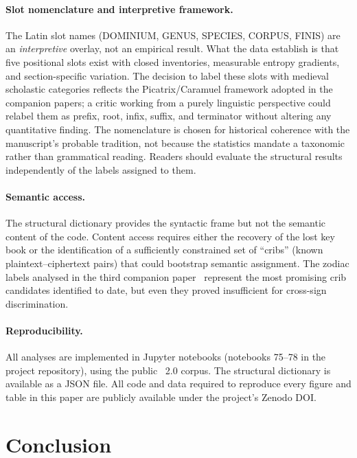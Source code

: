 \paragraph{Slot nomenclature and interpretive framework.}
The Latin slot names (DOMINIUM, GENUS, SPECIES, CORPUS, FINIS) are
an \emph{interpretive} overlay, not an empirical result. What the
data establish is that five positional slots exist with closed
inventories, measurable entropy gradients, and section-specific
variation. The decision to label these slots with medieval scholastic
categories reflects the Picatrix/Caramuel framework adopted in the
companion papers; a critic working from a purely linguistic
perspective could relabel them as prefix, root, infix, suffix, and
terminator without altering any quantitative finding. The nomenclature
is chosen for historical coherence with the manuscript's probable
tradition, not because the statistics mandate a taxonomic rather than
grammatical reading. Readers should evaluate the structural results
independently of the labels assigned to them.

\paragraph{Semantic access.}
The structural dictionary provides the syntactic frame but not
the semantic content of the code. Content access requires either
the recovery of the lost key book or the identification of a
sufficiently constrained set of ``cribs'' (known plaintext--ciphertext
pairs) that could bootstrap semantic assignment. The zodiac labels
analysed in the third companion paper~\citep{jimenez2026venusring}
represent the most promising crib candidates identified to date, but
even they proved insufficient for cross-sign discrimination.

\paragraph{Reproducibility.}
All analyses are implemented in Jupyter notebooks (notebooks 75--78
in the project repository), using the public \sta\ 2.0 corpus. The
structural dictionary is available as a JSON file. All code and data
required to reproduce every figure and table in this paper are
publicly available under the project's Zenodo DOI.


\section{Conclusion}
\label{sec:conclusion}

